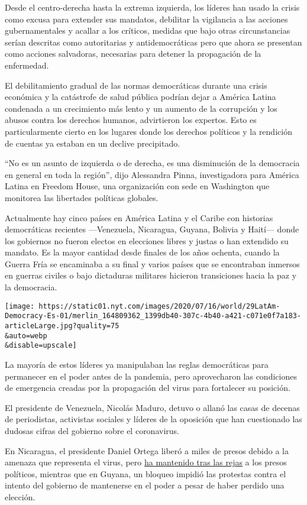Desde el centro-derecha hasta la extrema izquierda, los líderes han
usado la crisis como excusa para extender sus mandatos, debilitar la
vigilancia a las acciones gubernamentales y acallar a los críticos,
medidas que bajo otras circunstancias serían descritas como autoritarias
y antidemocráticas pero que ahora se presentan como acciones salvadoras,
necesarias para detener la propagación de la enfermedad.

El debilitamiento gradual de las normas democráticas durante una crisis
económica y la catástrofe de salud pública podrían dejar a América
Latina condenada a un crecimiento más lento y un aumento de la
corrupción y los abusos contra los derechos humanos, advirtieron los
expertos. Esto es particularmente cierto en los lugares donde los
derechos políticos y la rendición de cuentas ya estaban en un declive
precipitado.

``No es un asunto de izquierda o de derecha, es una disminución de la
democracia en general en toda la región'', dijo Alessandra Pinna,
investigadora para América Latina en Freedom House, una organización con
sede en Washington que monitorea las libertades políticas globales.

Actualmente hay cinco países en América Latina y el Caribe con historias
democráticas recientes ---Venezuela, Nicaragua, Guyana, Bolivia y
Haití--- donde los gobiernos no fueron electos en elecciones libres y
justas o han extendido su mandato. Es la mayor cantidad desde finales de
los años ochenta, cuando la Guerra Fría se encaminaba a su final y
varios países que se encontraban inmersos en guerras civiles o bajo
dictaduras militares hicieron transiciones hacia la paz y la democracia.

\texttt{[image: https://static01.nyt.com/images/2020/07/16/world/29LatAm-Democracy-Es-01/merlin\_164809362\_1399db40-307c-4b40-a421-c071e0f7a183-articleLarge.jpg?quality=75\\\&auto=webp\\\&disable=upscale]}

La mayoría de estos líderes ya manipulaban las reglas democráticas para
permanecer en el poder antes de la pandemia, pero aprovecharon las
condiciones de emergencia creadas por la propagación del virus para
fortalecer su posición.

El presidente de Venezuela, Nicolás Maduro, detuvo o allanó las casas de
decenas de periodistas, activistas sociales y líderes de la oposición
que han cuestionado las dudosas cifras del gobierno sobre el
coronavirus.

En Nicaragua, el presidente Daniel Ortega liberó a miles de presos
debido a la amenaza que representa el virus, pero
\href{https://www.barrons.com/news/nicaragua-excludes-political-prisoners-from-mass-release-01586430304}{ha
mantenido tras las rejas} a los presos políticos, mientras que en
Guyana, un bloqueo impidió las protestas contra el intento del gobierno
de mantenerse en el poder a pesar de haber perdido una elección.

